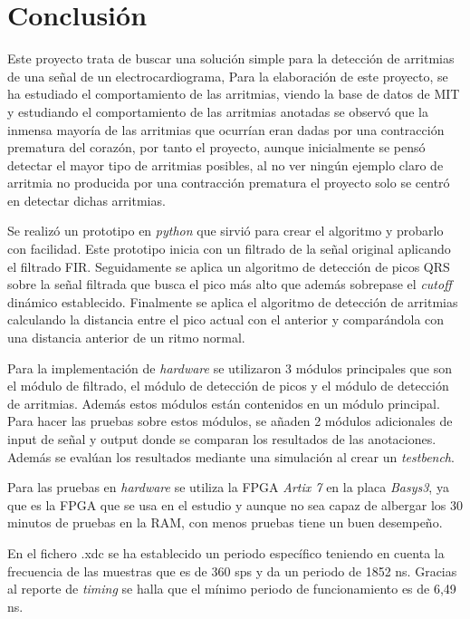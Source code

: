 \chapter{Conclusión}
Este proyecto trata de buscar una solución simple para la detección de arritmias de una señal de un electrocardiograma, Para la elaboración de este proyecto, 
se ha estudiado el comportamiento de las arritmias, viendo la base de datos de MIT y estudiando el comportamiento de las arritmias anotadas se observó que la inmensa mayoría de las arritmias que ocurrían eran dadas por una contracción prematura del corazón, por tanto el proyecto, aunque inicialmente se pensó detectar el mayor tipo de arritmias posibles, al no ver ningún ejemplo claro de arritmia no producida por una contracción prematura el proyecto solo se centró en detectar dichas arritmias.

Se realizó un prototipo en \textit{python} que sirvió para crear el algoritmo y probarlo con facilidad. Este prototipo inicia
con un filtrado de la señal original aplicando el filtrado FIR. Seguidamente se aplica un algoritmo de detección de 
picos QRS sobre la señal filtrada que busca el pico más alto que además sobrepase el \textit{cutoff} dinámico establecido. Finalmente
se aplica el algoritmo de detección de arritmias calculando la distancia entre el pico actual con el anterior y comparándola con una
distancia anterior de un ritmo normal.

Para la implementación de  \textit{hardware}  se utilizaron 3 módulos principales que son el módulo de filtrado, el módulo de detección de picos 
y el módulo de detección de arritmias. Además estos módulos están contenidos en un módulo principal. Para hacer las pruebas sobre
estos módulos, se añaden 2 módulos adicionales de input de señal y output donde se comparan los resultados de las anotaciones. Además 
se evalúan los resultados mediante una simulación al crear un \textit{testbench}.

Para las pruebas en  \textit{hardware}  se utiliza la FPGA \textit{Artix 7} en la placa \textit{Basys3}, ya que es la FPGA que se usa en el estudio y aunque no sea capaz de albergar los 30 minutos de pruebas en la RAM, con menos pruebas tiene un buen desempeño.

En el fichero .xdc se ha establecido un periodo específico teniendo en cuenta la frecuencia de las muestras que es de 360 sps y da un periodo de 1852 ns. Gracias al reporte de \textit{timing} se halla que el mínimo periodo de funcionamiento es de 6,49 ns.

